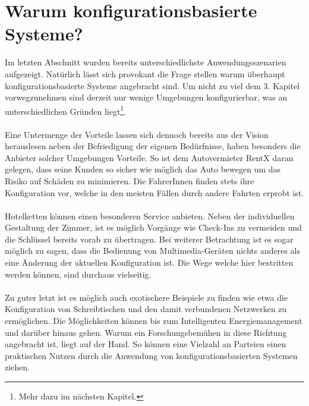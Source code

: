 \section{Warum konfigurationsbasierte Systeme?}
Im letzten Abschnitt wurden bereits unterschiedlichste Anwendungsszenarien aufgezeigt. Natürlich lässt sich provokant die Frage stellen warum überhaupt konfigurationsbasierte
Systeme angebracht sind. Um nicht zu viel dem 3. Kapitel vorwegzunehmen sind derzeit nur wenige Umgebungen konfigurierbar, was an unterschiedlichen Gründen 
liegt\footnote{Mehr dazu im nächsten Kapitel.}.
\\\\
Eine Untermenge der Vorteile lassen sich dennoch bereits aus der Vision herauslesen neben der Befriedigung der eigenen Bedürfnisse, haben besonders die Anbieter solcher 
Umgebungen Vorteile. So ist dem Autovermieter RentX daran gelegen, dass seine Kunden so sicher wie möglich das Auto bewegen um das Risiko auf Schäden zu minimieren. Die 
FahrerInnen finden stets ihre Konfiguration vor, welche in den meisten Fällen durch andere Fahrten erprobt ist.
\\\\
Hotelketten können einen besonderen Service anbieten. Neben der individuellen Gestaltung der Zimmer, ist es möglich Vorgänge wie Check-Ins zu vermeiden und die Schlüssel 
bereits vorab zu übertragen. Bei weiterer Betrachtung ist es sogar möglich zu sagen, dass die Bedienung von Multimedia-Geräten nichts anderes als eine Änderung der aktuellen
Konfiguration ist. Die Wege welche hier bestritten werden können, sind durchaus vielseitig. 
\\\\
Zu guter letzt ist es möglich auch exotischere Beispiele zu finden wie etwa die Konfiguration von Schreibtischen und den damit verbundenen Netzwerken zu ermöglichen. 
Die Möglichkeiten können bis zum Intelligenten Energiemanagement und darüber hinaus gehen.
Warum ein Forschungsbemühen in diese Richtung angebracht ist, liegt auf der Hand. So können eine Vielzahl an Parteien einen praktischen Nutzen durch die Anwendung von 
konfigurationsbasierten Systemen ziehen.

